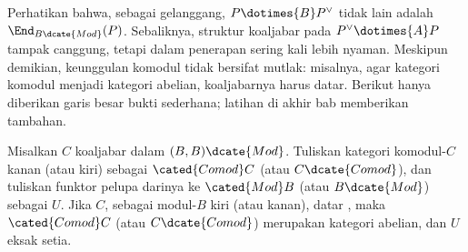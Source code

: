 Perhatikan bahwa, sebagai gelanggang, $P\dotimes{B}P^\vee$ tidak lain adalah
$\End_{B\dcate{Mod}}(P)$. Sebaliknya, struktur koaljabar pada
$P^\vee\dotimes{A}P$ tampak canggung, tetapi dalam penerapan sering kali
lebih nyaman. Meskipun demikian, keunggulan komodul tidak bersifat mutlak:
misalnya, agar kategori komodul menjadi kategori abelian, koaljabarnya harus
datar. Berikut hanya diberikan garis besar bukti sederhana; latihan di akhir
bab memberikan tambahan.

\begin{proposition}\label{prop:Comod-abelian}
	Misalkan $C$ koaljabar dalam $(B,B)\dcate{Mod}$. Tuliskan kategori
	komodul-$C$ kanan (atau kiri) sebagai $\cated{Comod}C$ (atau
	$C\dcate{Comod}$), dan tuliskan funktor pelupa darinya ke
	$\cated{Mod}B$ (atau $B\dcate{Mod}$) sebagai $U$. Jika $C$, sebagai
	modul-$B$ kiri (atau kanan), datar \cite[Definisi 6.9.4]{Li1}, maka
	$\cated{Comod}C$ (atau $C\dcate{Comod}$) merupakan kategori abelian,
	dan $U$ eksak setia.
\end{proposition}
